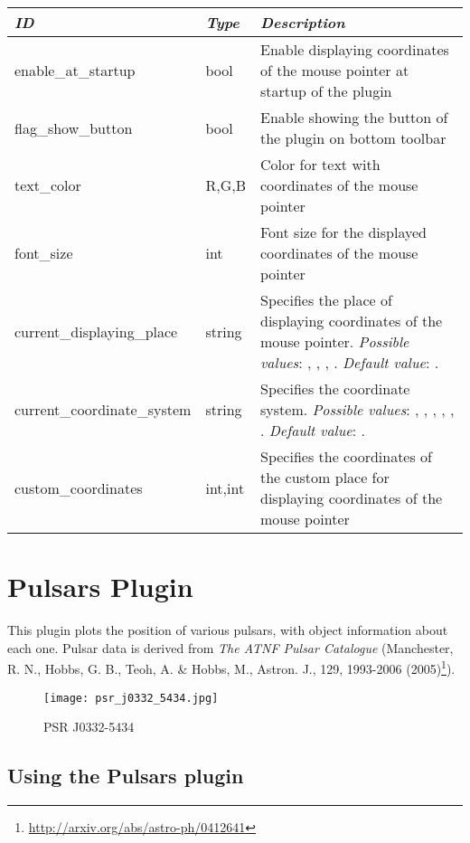 \begin{longtabu} to \textwidth {l|l|X}\toprule
\emph{ID}            & \emph{Type} & \emph{Description}\\\midrule
enable\_at\_startup  & bool & Enable displaying coordinates of the mouse pointer at startup of the plugin\\\midrule
flag\_show\_button   & bool & Enable showing the button of the plugin on bottom toolbar\\\midrule
text\_color          & R,G,B & Color for text with coordinates of the mouse pointer \\\midrule
font\_size           & int & Font size for the displayed coordinates of the mouse pointer \\\midrule
current\_displaying\_place  & string & Specifies the place of displaying coordinates of the mouse pointer. \textit{Possible values}: , , , . \textit{Default value}: . \\\midrule
current\_coordinate\_system & string & Specifies the coordinate system. \textit{Possible values}: , , , , , . \textit{Default value}: . \\\midrule
custom\_coordinates  & int,int & Specifies the coordinates of the custom place for displaying coordinates of the mouse pointer \\\bottomrule
\end{longtabu}

\newpage
\section{Pulsars Plugin}
\label{sec:plugins:Pulsars}

This plugin plots the position of various pulsars, with object information about each one. Pulsar data is derived from \textit{The ATNF Pulsar Catalogue} (Manchester, R. N., Hobbs, G. B., Teoh, A. \& Hobbs, M., Astron. J., 129, 1993-2006 (2005)\footnote{\url{http://arxiv.org/abs/astro-ph/0412641}}).

\begin{figure}[h]
\texttt{[image: psr\_j0332\_5434.jpg]}
\label{fig:PSR_J0332-5434}
\caption{PSR J0332-5434}
\end{figure}

\subsection{Using the Pulsars plugin}
\label{sec:plugins:Pulsars:using}

